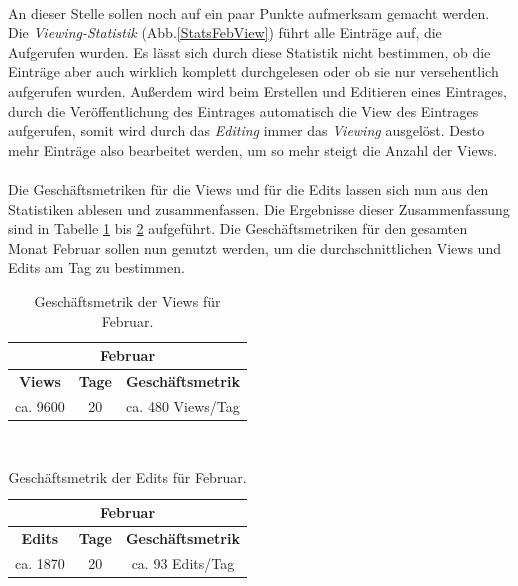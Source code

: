 \documentclass[a4paper,12pt,twoside]{scrartcl}
\begin{document}
\\
An dieser Stelle sollen noch auf ein paar Punkte aufmerksam gemacht werden. Die \textit{Viewing-Statistik} (Abb.\ref{StatsFebView}) führt alle Einträge auf, die Aufgerufen wurden. Es lässt sich durch diese Statistik nicht bestimmen, ob die Einträge aber auch wirklich komplett durchgelesen oder ob sie nur versehentlich aufgerufen wurden. Außerdem wird beim Erstellen und Editieren eines Eintrages, durch die Veröffentlichung des Eintrages automatisch die View des Eintrages aufgerufen, somit wird durch das \textit{Editing} immer das \textit{Viewing} ausgelöst. Desto mehr Einträge also bearbeitet werden, um so mehr steigt die Anzahl der Views. 
\\\\
Die Geschäftsmetriken für die Views und für die Edits lassen sich nun aus den Statistiken ablesen und zusammenfassen. Die Ergebnisse dieser Zusammenfassung sind in Tabelle \ref{ViewKennzahlenFeb} bis \ref{EditKennzahlenFeb} aufgeführt. Die Geschäftsmetriken für den gesamten Monat Februar sollen nun genutzt werden, um die durchschnittlichen Views und Edits am Tag zu bestimmen.
\begin{table}[htb]
\begin{center}
\begin{tabular}{|c|c|c|}\hline
\multicolumn{3}{|c|}{\textbf{Februar}} \rule{0pt}{15pt}\\
\hline
\rule{0pt}{15pt} \textbf{Views} & \textbf{Tage} & \textbf{Geschäftsmetrik} \\ 
\hline
\rule{0pt}{15pt} ca. 9600 & 20 & ca. 480 Views/Tag \\
\hline
\end{tabular}
\caption{Geschäftsmetrik der Views für Februar.}
\label{ViewKennzahlenFeb}
\end{center}
\end{table}
\\
\begin{table}[htb]
\begin{center}
\begin{tabular}{|c|c|c|}\hline
\multicolumn{3}{|c|}{\textbf{Februar}} \rule{0pt}{15pt}\\
\hline
\rule{0pt}{15pt} \textbf{Edits} & \textbf{Tage} & \textbf{Geschäftsmetrik} \\ 
\hline
\rule{0pt}{15pt} ca. 1870 & 20 & ca. 93 Edits/Tag \\
\hline
\end{tabular}
\caption{Geschäftsmetrik der Edits für Februar.}
\label{EditKennzahlenFeb}
\end{center}
\end{table}
\end{document}
